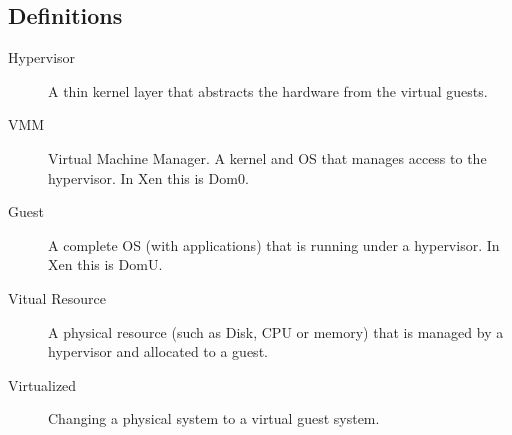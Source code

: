 \subsection{Definitions}
\begin{description}
  \item[Hypervisor] A thin kernel layer that abstracts the hardware from the virtual guests.\\
  \item[VMM] Virtual Machine Manager. A kernel and OS that manages access to the hypervisor.  In Xen this is Dom0.
  \item[Guest] A complete OS (with applications) that is running under a hypervisor.  In Xen this is DomU.
  \item[Vitual Resource]  A physical resource (such as Disk, CPU or memory) that is managed by a hypervisor and allocated to a guest.
  \item[Virtualized] Changing a physical system to a virtual guest system.
\end{description}
